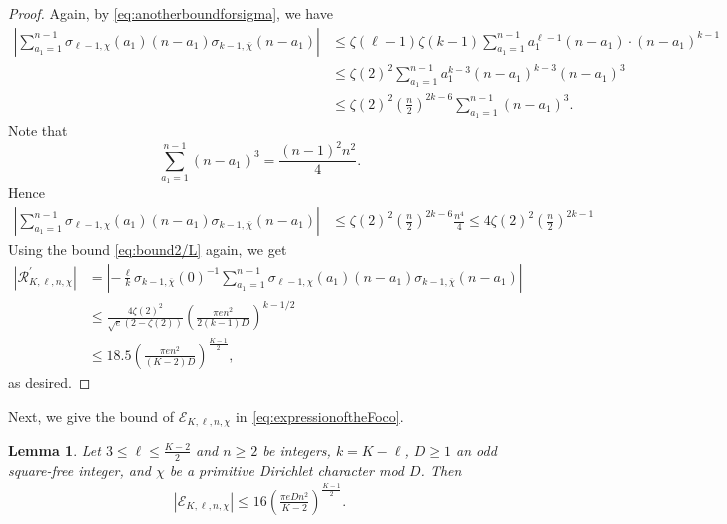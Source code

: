 \documentclass[11pt,letterpaper,reqno]{amsart}
\numberwithin{figure}{section}
\numberwithin{table}{section}
\theoremstyle{definition}
\theoremstyle{plain}
\newtheorem{lemma}[theorem]{Lemma}
\theoremstyle{definition}
\theoremstyle{definition}
\theoremstyle{remark}
\numberwithin{equation}{section}
\theoremstyle{remark}
\begin{document}
\begin{proof}Again, by \eqref{eq:anotherboundforsigma}, we have
    \begin{align*}
        \left|\sum_{a_1=1}^{n-1}\sigma_{\ell-1,\chi}(a_1)(n-a_1)\sigma_{k-1,\overline{\chi}}(n-a_1)\right|&\leq\zeta(\ell-1)\zeta(k-1)\sum_{a_1=1}^{n-1}a_1^{\ell-1}(n-a_1)\cdot (n-a_1)^{k-1}\\&\leq\zeta(2)^2\sum_{ a_1=1}^{n-1}a_1^{k-3}(n-a_1)^{k-3}(n-a_1)^3\\&\leq\zeta(2)^2\left(\frac{n}{2}\right)^{2k-6}\sum_{a_1=1}^{n-1}(n-a_1)^3.
    \end{align*}
    Note that 
    $$\sum_{a_1=1}^{n-1}(n-a_1)^3=\frac{(n-1)^2n^2}{4}.$$
    Hence
        \begin{align*}
      \left|\sum_{a_1=1}^{n-1}\sigma_{\ell-1,\chi}(a_1)(n-a_1)\sigma_{k-1,\overline{\chi}}(n-a_1)\right|&\leq\zeta(2)^2\left(\frac{n}{2}\right)^{2k-6}\frac{n^4}{4}\leq4\zeta(2)^2\left(\frac{n}{2}\right)^{2k-1}
    \end{align*}
Using the bound \eqref{eq:bound2/L} again, we get   
\begin{align*}
   |\mathcal{R}_{K,\ell,n,\chi}^{\prime}|&=\left|-\frac{\ell}{k}\sigma_{k-1,\overline{\chi}}(0)^{-1}\sum_{a_1=1}^{n-1}\sigma_{\ell-1,\chi}(a_1)(n-a_1)\sigma_{k-1,\overline{\chi}}(n-a_1)\right|\\&\leq\frac{4\zeta(2)^2}{\sqrt{e}(2-\zeta(2))}\left(\frac{\pi en^2}{2(k-1)D}\right)^{k-1/2}
   \\&\leq18.5\left(\frac{\pi en^2}{(K-2)D}\right)^{\frac{K-1}{2}},
\end{align*}
    as desired.
\end{proof}
Next, we give the bound   of $\mathscr{E}_{K,\ell,n,\chi}$ in \eqref{eq:expressionoftheFoco}. 
\begin{lemma}\label{lem:bdDtermprod}
    Let $3\leq\ell\leq\frac{K-2}{2}$ and $n\geq2$ be integers, $k=K-\ell$, $D\geq1$ an odd square-free integer, and $\chi$ be a primitive Dirichlet character mod $D$. Then
     \begin{align*}
         |\mathscr{E}_{K,\ell,n,\chi}|\leq 16\left(\frac{\pi eDn^2}{K-2}\right)^{\frac{K-1}{2}}.
     \end{align*}
\end{lemma}
\end{document}
